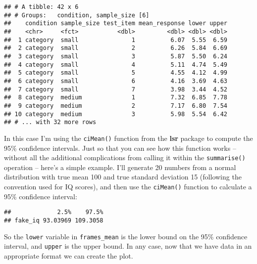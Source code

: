 \documentclass[]{book}
\newenvironment{Shaded}{\begin{snugshade}}{\end{snugshade}}
\newcommand{\CommentTok}[1]{\textcolor[rgb]{0.56,0.35,0.01}{\textit{#1}}}
\newcommand{\DataTypeTok}[1]{\textcolor[rgb]{0.13,0.29,0.53}{#1}}
\newcommand{\DecValTok}[1]{\textcolor[rgb]{0.00,0.00,0.81}{#1}}
\newcommand{\KeywordTok}[1]{\textcolor[rgb]{0.13,0.29,0.53}{\textbf{#1}}}
\newcommand{\NormalTok}[1]{#1}
\newcommand{\OperatorTok}[1]{\textcolor[rgb]{0.81,0.36,0.00}{\textbf{#1}}}
\newcommand{\StringTok}[1]{\textcolor[rgb]{0.31,0.60,0.02}{#1}}
\begin{document}
\begin{verbatim}
## # A tibble: 42 x 6
## # Groups:   condition, sample_size [6]
##    condition sample_size test_item mean_response lower upper
##    <chr>     <fct>           <dbl>         <dbl> <dbl> <dbl>
##  1 category  small               1          6.07  5.55  6.59
##  2 category  small               2          6.26  5.84  6.69
##  3 category  small               3          5.87  5.50  6.24
##  4 category  small               4          5.11  4.74  5.49
##  5 category  small               5          4.55  4.12  4.99
##  6 category  small               6          4.16  3.69  4.63
##  7 category  small               7          3.98  3.44  4.52
##  8 category  medium              1          7.32  6.85  7.78
##  9 category  medium              2          7.17  6.80  7.54
## 10 category  medium              3          5.98  5.54  6.42
## # ... with 32 more rows
\end{verbatim}

In this case I'm using the \texttt{ciMean()} function from the \textbf{lsr} package to compute the 95\% confidence intervals. Just so that you can see how this function works -- without all the additional complications from calling it within the \texttt{summarise()} operation -- here's a simple example. I'll generate 20 numbers from a normal distribution with true mean 100 and true standard deviation 15 (following the convention used for IQ scores), and then use the \texttt{ciMean()} function to calculate a 95\% confidence interval:

\begin{Shaded}
\end{Shaded}

\begin{verbatim}
##             2.5%    97.5%
## fake_iq 93.03969 109.3058
\end{verbatim}

So the \texttt{lower} variable in \texttt{frames\_mean} is the lower bound on the 95\% confidence interval, and \texttt{upper} is the upper bound. In any case, now that we have data in an appropriate format we can create the plot.
\end{document}
